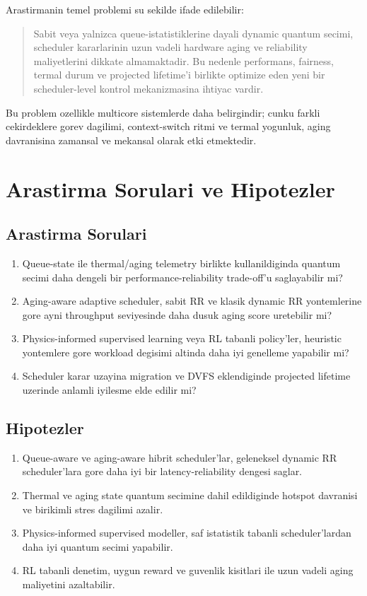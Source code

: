 \documentclass[12pt,a4paper]{article}
\begin{document}
Arastirmanin temel problemi su sekilde ifade edilebilir:

\begin{quote}
Sabit veya yalnizca queue-istatistiklerine dayali dynamic quantum secimi, scheduler kararlarinin uzun vadeli
hardware aging ve reliability maliyetlerini dikkate almamaktadir. Bu nedenle performans, fairness, termal durum
ve projected lifetime'i birlikte optimize eden yeni bir scheduler-level kontrol mekanizmasina ihtiyac vardir.
\end{quote}

Bu problem ozellikle multicore sistemlerde daha belirgindir; cunku farkli cekirdeklere gorev dagilimi, context-switch
ritmi ve termal yogunluk, aging davranisina zamansal ve mekansal olarak etki etmektedir.

\section{Arastirma Sorulari ve Hipotezler}

\subsection{Arastirma Sorulari}

\begin{enumerate}[leftmargin=*]
\item Queue-state ile thermal/aging telemetry birlikte kullanildiginda quantum secimi daha dengeli bir performance-reliability trade-off'u saglayabilir mi?
\item Aging-aware adaptive scheduler, sabit RR ve klasik dynamic RR yontemlerine gore ayni throughput seviyesinde daha dusuk aging score uretebilir mi?
\item Physics-informed supervised learning veya RL tabanli policy'ler, heuristic yontemlere gore workload degisimi altinda daha iyi genelleme yapabilir mi?
\item Scheduler karar uzayina migration ve DVFS eklendiginde projected lifetime uzerinde anlamli iyilesme elde edilir mi?
\end{enumerate}

\subsection{Hipotezler}

\begin{enumerate}[leftmargin=*]
\item Queue-aware ve aging-aware hibrit scheduler'lar, geleneksel dynamic RR scheduler'lara gore daha iyi bir latency-reliability dengesi saglar.
\item Thermal ve aging state quantum secimine dahil edildiginde hotspot davranisi ve birikimli stres dagilimi azalir.
\item Physics-informed supervised modeller, saf istatistik tabanli scheduler'lardan daha iyi quantum secimi yapabilir.
\item RL tabanli denetim, uygun reward ve guvenlik kisitlari ile uzun vadeli aging maliyetini azaltabilir.
\end{enumerate}
\end{document}

